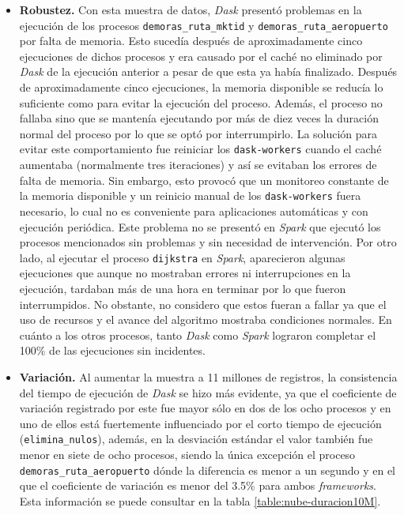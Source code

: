 \begin{itemize}
	\item \textbf{Robustez.} Con esta muestra de datos, \textit{Dask} presentó problemas en la ejecución de los procesos \texttt{demoras\_ruta\_mktid} y \texttt{demoras\_ruta\_aeropuerto} por falta de memoria. Esto sucedía después de aproximadamente cinco ejecuciones de dichos procesos y era causado por el caché no eliminado por \textit{Dask} de la ejecución anterior a pesar de que esta ya había finalizado. Después de aproximadamente cinco ejecuciones, la memoria disponible se reducía lo suficiente como para evitar la ejecución del proceso. Además, el proceso no fallaba sino que se mantenía ejecutando por más de diez veces la duración normal del proceso por lo que se optó por interrumpirlo. La solución para evitar este comportamiento fue reiniciar los \texttt{dask-workers} cuando el caché aumentaba (normalmente tres iteraciones) y así se evitaban los errores de falta de memoria. Sin embargo, esto provocó que un monitoreo constante de la memoria disponible y un reinicio manual de los \texttt{dask-workers} fuera necesario, lo cual no es conveniente para aplicaciones automáticas y con ejecución periódica. Este problema no se presentó en \textit{Spark} que ejecutó los procesos mencionados sin problemas y sin necesidad de intervención. Por otro lado, al ejecutar el proceso \texttt{dijkstra} en \textit{Spark}, aparecieron algunas ejecuciones que aunque no mostraban errores ni interrupciones en la ejecución, tardaban más de una hora en terminar por lo que fueron interrumpidos. No obstante, no considero que estos fueran a fallar ya que el uso de recursos y el avance del algoritmo mostraba condiciones normales. En cuánto a los otros procesos, tanto \textit{Dask} como \textit{Spark} lograron completar el 100\% de las ejecuciones sin incidentes.

	\item \textbf{Variación.} Al aumentar la muestra a 11 millones de registros, la consistencia del tiempo de ejecución de \textit{Dask} se hizo más evidente, ya que el coeficiente de variación registrado por este fue mayor sólo en dos de los ocho procesos y en uno de ellos está fuertemente influenciado por el corto tiempo de ejecución (\texttt{elimina\_nulos}), además, en la desviación estándar el valor también fue menor en siete de ocho procesos, siendo la única excepción el proceso \texttt{demoras\_ruta\_aeropuerto} dónde la diferencia es menor a un segundo y en el que el coeficiente de variación es menor del 3.5\% para ambos \textit{frameworks}. Esta información se puede consultar en la tabla \ref{table:nube-duracion10M}.
	

\end{itemize}
